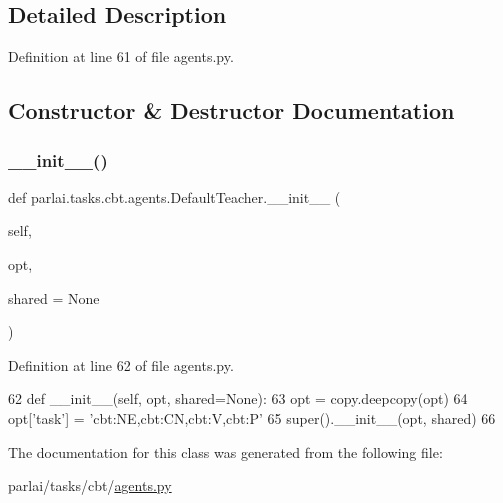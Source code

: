 \subsection{Detailed Description}


Definition at line 61 of file agents.\+py.



\subsection{Constructor \& Destructor Documentation}
\mbox{\label{classparlai_1_1tasks_1_1cbt_1_1agents_1_1DefaultTeacher_a2a25b29b63e7edb52d411115ee5e2030}} 
\subsubsection{\texorpdfstring{\+\_\+\+\_\+init\+\_\+\+\_\+()}{\_\_init\_\_()}}
{\footnotesize\ttfamily def parlai.\+tasks.\+cbt.\+agents.\+Default\+Teacher.\+\_\+\+\_\+init\+\_\+\+\_\+ (\begin{DoxyParamCaption}\item[{}]{self,  }\item[{}]{opt,  }\item[{}]{shared = {\ttfamily None} }\end{DoxyParamCaption})}



Definition at line 62 of file agents.\+py.


\begin{DoxyCode}
62     \textcolor{keyword}{def }\_\_init\_\_(self, opt, shared=None):
63         opt = copy.deepcopy(opt)
64         opt[\textcolor{stringliteral}{'task'}] = \textcolor{stringliteral}{'cbt:NE,cbt:CN,cbt:V,cbt:P'}
65         super().\_\_init\_\_(opt, shared)
66 \end{DoxyCode}


The documentation for this class was generated from the following file\+:\begin{DoxyCompactItemize}
\item 
parlai/tasks/cbt/\hyperlink{parlai_2tasks_2cbt_2agents_8py}{agents.\+py}\end{DoxyCompactItemize}
